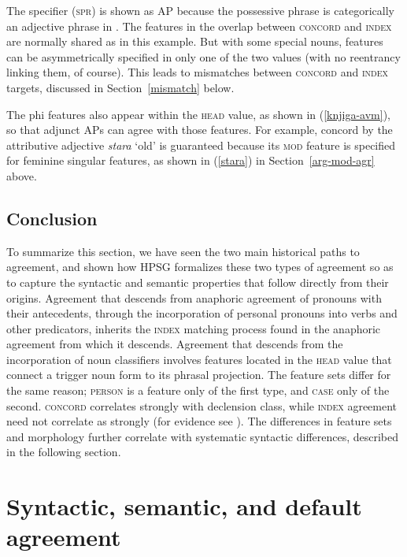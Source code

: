 \documentclass[output=paper,biblatex,babelshorthands,newtxmath,draftmode,colorlinks,citecolor=brown]{langscibook}
\begin{document}
\noindent
The specifier (\textsc{spr}) is shown as AP because the possessive phrase is categorically an
adjective phrase in .  The features in the overlap between \textsc{concord} and
\textsc{index} are normally shared as in this example.  But with some special nouns, features can be
asymmetrically specified in only one of the two values (with no reentrancy linking them, of course).
This leads to mismatches between \textsc{concord} and \textsc{index} targets, discussed in
Section~\ref{mismatch} below. 

The phi features also appear within the \textsc{head} value, as shown in (\ref{knjiga-avm}), so that
adjunct APs can agree with those features.  For example, concord by the attributive adjective
\textit{stara} `old' is guaranteed because its \textsc{mod} feature is specified for feminine
singular features, as shown in (\ref{stara}) in Section~\ref{arg-mod-agr} above. 


\subsection{Conclusion}

\largerpage%
To summarize this section, we have seen the two main historical paths to agreement, and shown how
HPSG formalizes these two types of agreement so as to capture the syntactic and semantic properties
that follow directly from their origins.  Agreement that descends from anaphoric agreement of
pronouns with their antecedents, through the incorporation of personal pronouns into verbs and other
predicators, inherits the \textsc{index} matching process found in the anaphoric agreement from
which it descends.  Agreement that descends from the incorporation of noun classifiers involves
features located in the \textsc{head} value that connect a trigger noun form to its phrasal
projection.  The feature sets differ for the same reason; \textsc{person} is a feature only of the
first type, and \textsc{case} only of the second.  \textsc{concord} correlates strongly with
declension class, while \textsc{index} agreement need not correlate as strongly (for evidence see
\citealt[Chapter~2]{Wechsler+Zlatic:2003}).  The differences in feature sets and morphology further
correlate with systematic syntactic differences, described in the following section.   


\section{Syntactic, semantic, and default agreement}
\label{pancake-sec}
 
\end{document}
